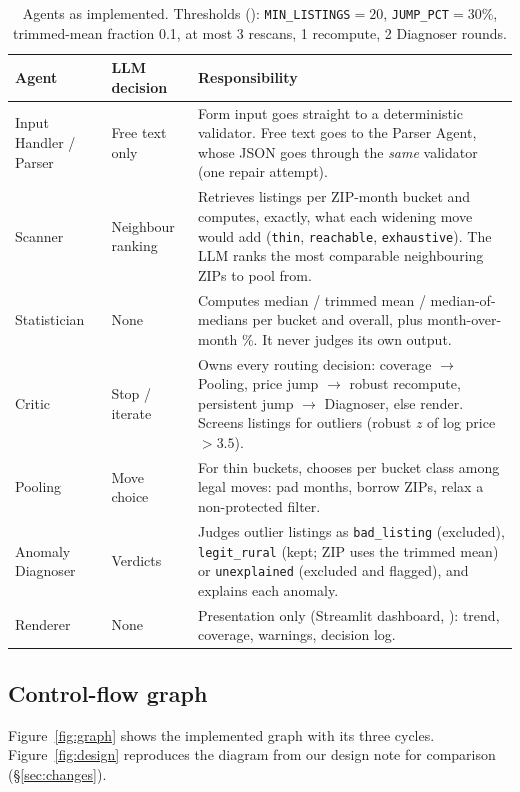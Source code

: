 \documentclass[11pt,a4paper]{article}
\newcommand{\file}[1]{\texttt{\detokenize{#1}}}
\begin{document}
\begin{table}[h]
\centering\small
\begin{tabularx}{\textwidth}{@{}L{2.6cm}L{2.2cm}X@{}}
\toprule
Agent & LLM decision & Responsibility \\
\midrule
Input Handler / Parser & Free text only & Form input goes straight to a deterministic validator. Free text goes to the Parser Agent, whose JSON goes through the \emph{same} validator (one repair attempt). \\
Scanner & Neighbour ranking & Retrieves listings per ZIP-month bucket and computes, exactly, what each widening move would add (\texttt{thin}, \texttt{reachable}, \texttt{exhaustive}). The LLM ranks the most comparable neighbouring ZIPs to pool from. \\
Statistician & None & Computes median / trimmed mean / median-of-medians per bucket and overall, plus month-over-month \%. It never judges its own output. \\
Critic & Stop / iterate & Owns every routing decision: coverage $\rightarrow$ Pooling, price jump $\rightarrow$ robust recompute, persistent jump $\rightarrow$ Diagnoser, else render. Screens listings for outliers (robust $z$ of log price $>3.5$). \\
Pooling & Move choice & For thin buckets, chooses per bucket class among legal moves: pad months, borrow ZIPs, relax a non-protected filter. \\
Anomaly Diagnoser & Verdicts & Judges outlier listings as \texttt{bad\_listing} (excluded), \texttt{legit\_rural} (kept; ZIP uses the trimmed mean) or \texttt{unexplained} (excluded and flagged), and explains each anomaly. \\
Renderer & None & Presentation only (Streamlit dashboard, \file{app_input.py}): trend, coverage, warnings, decision log. \\
\bottomrule
\end{tabularx}
\caption{Agents as implemented. Thresholds (\file{housing_trends/state.py}): \texttt{MIN\_LISTINGS}$=20$,
\texttt{JUMP\_PCT}$=30\%$, trimmed-mean fraction 0.1, at most 3 rescans, 1 recompute, 2 Diagnoser rounds.}
\label{tab:agents}
\end{table}

\subsection{Control-flow graph}
Figure~\ref{fig:graph} shows the implemented graph with its three cycles. Figure~\ref{fig:design} reproduces the
diagram from our design note for comparison (\S\ref{sec:changes}).
\end{document}

